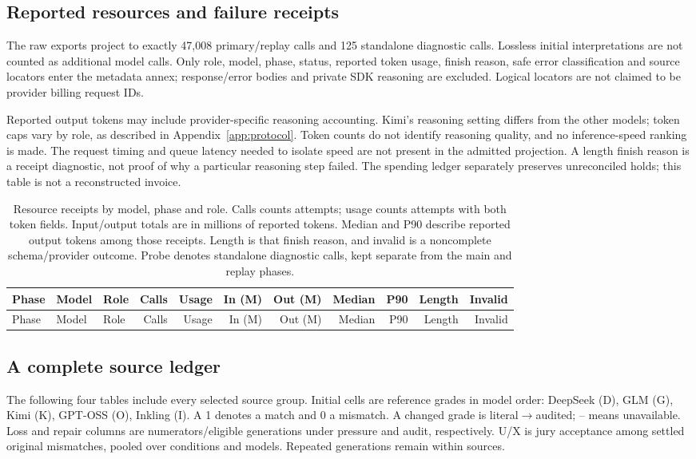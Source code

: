 \subsection{Reported resources and failure receipts}
\label{app:diagnostic-resources}
The raw exports project to exactly 47,008 primary/replay calls and 125
standalone diagnostic calls. Lossless initial interpretations are not counted
as additional model calls. Only role, model, phase, status, reported token
usage, finish reason, safe error classification and source locators enter the
metadata annex; response/error bodies and private SDK reasoning are excluded.
Logical locators are not claimed to be provider billing request IDs.

Reported output tokens may include provider-specific reasoning accounting.
Kimi's reasoning setting differs from the other models; token caps vary by
role, as described in Appendix~\ref{app:protocol}. Token counts do not identify reasoning
quality, and no inference-speed ranking is made. The request timing and queue
latency needed to isolate speed are not present in the admitted projection.
A length finish reason is a receipt diagnostic, not proof of why a particular
reasoning step failed. The spending ledger separately preserves unreconciled
holds; this table is not a reconstructed invoice.

\begingroup\small\setlength{\tabcolsep}{3pt}
\begin{longtable}{lllrrrrrrrr}
\caption{Resource receipts by model, phase and role. Calls counts attempts;
usage counts attempts with both token fields. Input/output totals are in
millions of reported tokens. Median and P90 describe reported output tokens
among those receipts. Length is that finish reason, and invalid is a noncomplete
schema/provider outcome. Probe denotes standalone diagnostic calls, kept
separate from the main and replay phases.}
\label{tab:diagnostic-resources}\\
\toprule Phase & Model & Role & Calls & Usage & In (M) & Out (M) & Median & P90 & Length & Invalid\\\midrule\endfirsthead
\toprule Phase & Model & Role & Calls & Usage & In (M) & Out (M) & Median & P90 & Length & Invalid\\\midrule\endhead

\bottomrule\end{longtable}\endgroup

\subsection{A complete source ledger}
\label{app:diagnostic-source-ledger}
The following four tables include every selected source group. Initial cells
are reference grades in model order: DeepSeek (D), GLM (G), Kimi (K), GPT-OSS
(O), Inkling (I). A 1 denotes a match and 0 a mismatch. A changed grade is
literal$\to$audited; -- means unavailable.
Loss and repair columns are numerators/eligible generations under pressure and
audit, respectively. U/X is jury acceptance among settled original mismatches,
pooled over conditions and models. Repeated generations remain within sources.

